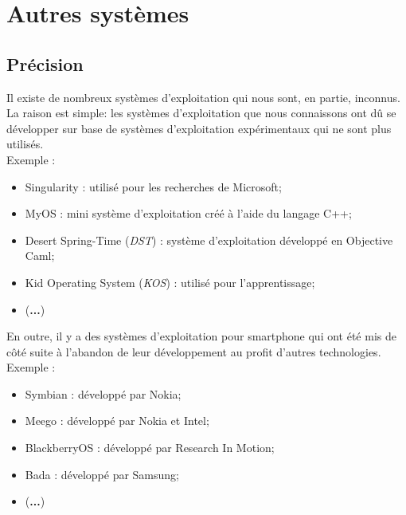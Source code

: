 \section{Autres systèmes}
\subsection{Précision}
Il existe de nombreux systèmes d'exploitation qui nous sont, en partie,
inconnus. \\

La raison est simple: les systèmes d'exploitation que nous connaissons ont dû se
développer sur base de systèmes d'exploitation expérimentaux qui ne sont plus
utilisés. \\

Exemple : \\

\begin{itemize}
\item Singularity : utilisé pour les recherches de Microsoft; \\

\item MyOS : mini système d'exploitation créé à l'aide du langage C++; \\

\item Desert Spring-Time (\textit{DST}) : système d'exploitation développé en
Objective Caml; \\

\item Kid Operating System (\textit{KOS}) : utilisé pour l'apprentissage; \\

\item (\textbf{...}) \\
\end{itemize}

En outre, il y a des systèmes d'exploitation pour smartphone qui ont été mis de
côté suite à l'abandon de leur développement au profit d'autres technologies. \\

Exemple : \\

\begin{itemize}
\item Symbian : développé par Nokia; \\

\item Meego : développé par Nokia et Intel; \\

\item BlackberryOS : développé par Research In Motion; \\

\item Bada : développé par Samsung; \\

\item (\textbf{...})
\end{itemize}

